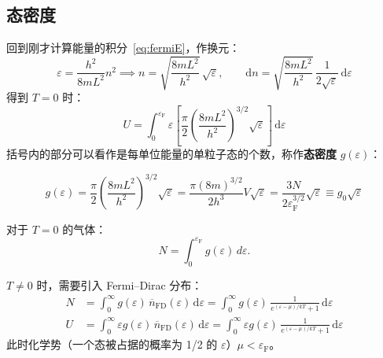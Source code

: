 \subsection{态密度}
回到刚才计算能量的积分~\eqref{eq:fermiE}，作换元：
\begin{equation}
    \varepsilon=\frac{h^2}{8mL^2}n^2
    \implies
    n=\sqrt{\frac{8mL^2}{h^2}}\,\sqrt{\varepsilon},
    \qquad
    \mathrm{d}n=\sqrt{\frac{8mL^2}{h^2}}\,\frac{1}{2\sqrt{\varepsilon}}\,\mathrm{d}\varepsilon
\end{equation}
得到 $T=0$ 时：
\begin{equation}
    U=\int_0^{\varepsilon_\mathrm{F}}\varepsilon\left[\frac{\pi}{2}\left(\frac{8mL^2}{h^2}\right)^{3/2}\sqrt{\varepsilon}\right]\,\mathrm{d}\varepsilon
\end{equation}
括号内的部分可以看作是每单位能量的单粒子态的个数，称作\textbf{态密度} $g(\varepsilon)$：
\begin{definition}[态密度]
    \begin{equation}\label{eq:state_density}
        g(\varepsilon)
        =\frac{\pi}{2}\left(\frac{8mL^2}{h^2}\right)^{3/2}\sqrt{\varepsilon}
        =\frac{\pi(8m)^{3/2}}{2h^3}V\sqrt{\varepsilon}
        =\frac{3N}{2\varepsilon_\mathrm{F}^{3/2}}\sqrt{\varepsilon}
        \equiv g_0\sqrt{\varepsilon}
    \end{equation}
\end{definition}

对于 $T=0$ 的气体：
\begin{equation}
    N=\int_0^{\varepsilon_\mathrm{F}}g(\varepsilon)\,d\varepsilon.
\end{equation}



$T\neq 0$ 时，需要引入 Fermi--Dirac 分布：
\begin{align}
    N&=\int_0^{\infty}g(\varepsilon)\,\overline n_{\mathrm{FD}}(\varepsilon)\,\mathrm{d}\varepsilon=\int_0^{\infty}g(\varepsilon)\,\frac{1}{e^{(\varepsilon-\mu)/kT}+1}\,\mathrm{d}\varepsilon\\
    U&=\int_0^{\infty}\varepsilon g(\varepsilon)\,\overline n_{\mathrm{FD}}(\varepsilon)\,\mathrm{d}\varepsilon=\int_0^{\infty}\varepsilon g(\varepsilon)\,\frac{1}{e^{(\varepsilon-\mu)/kT}+1}\,\mathrm{d}\varepsilon
\end{align}
此时化学势（一个态被占据的概率为 1/2 的 $\varepsilon$）$\mu<\varepsilon_\mathrm{F}$。



